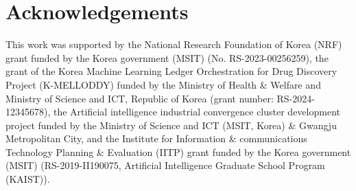 \section*{Acknowledgements}
This work was supported by the National Research Foundation of Korea (NRF) grant funded by the Korea government (MSIT) (No. RS-2023-00256259), the grant of the Korea Machine Learning Ledger Orchestration for Drug Discovery Project (K-MELLODDY) funded by the Ministry of Health \& Welfare and Ministry of Science and ICT, Republic of Korea (grant number: RS-2024-12345678), the Artificial intelligence industrial convergence cluster development project funded by the Ministry of Science and ICT (MSIT, Korea) \& Gwangju Metropolitan City, and the Institute for Information \& communications Technology Planning \& Evaluation (IITP) grant funded by the Korea government (MSIT) (RS-2019-II190075, Artificial Intelligence Graduate School Program (KAIST)).

